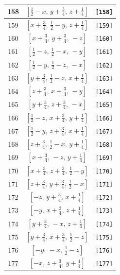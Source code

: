 \documentclass[fleqn,8pt]{jsarticle}
\begin{document}
\begin{longtable}{ccc}
158 & $\left[ \frac{1}{2} - x,\, y + \frac{3}{4},\, z + \frac{1}{4} \right]$ & {\tt [158]} \\ \hline
159 & $\left[ x + \frac{3}{4},\, \frac{1}{2} - y,\, z + \frac{1}{4} \right]$ & {\tt [159]} \\ \hline
160 & $\left[ x + \frac{3}{4},\, y + \frac{3}{4},\, - z \right]$ & {\tt [160]} \\ \hline
161 & $\left[ \frac{1}{2} - z,\, \frac{1}{2} - x,\, - y \right]$ & {\tt [161]} \\ \hline
162 & $\left[ \frac{1}{2} - y,\, \frac{1}{2} - z,\, - x \right]$ & {\tt [162]} \\ \hline
163 & $\left[ y + \frac{3}{4},\, \frac{1}{2} - z,\, x + \frac{1}{4} \right]$ & {\tt [163]} \\ \hline
164 & $\left[ z + \frac{3}{4},\, x + \frac{3}{4},\, - y \right]$ & {\tt [164]} \\ \hline
165 & $\left[ y + \frac{3}{4},\, z + \frac{3}{4},\, - x \right]$ & {\tt [165]} \\ \hline
166 & $\left[ \frac{1}{2} - z,\, x + \frac{3}{4},\, y + \frac{1}{4} \right]$ & {\tt [166]} \\ \hline
167 & $\left[ \frac{1}{2} - y,\, z + \frac{3}{4},\, x + \frac{1}{4} \right]$ & {\tt [167]} \\ \hline
168 & $\left[ z + \frac{3}{4},\, \frac{1}{2} - x,\, y + \frac{1}{4} \right]$ & {\tt [168]} \\ \hline
169 & $\left[ x + \frac{3}{4},\, - z,\, y + \frac{1}{4} \right]$ & {\tt [169]} \\ \hline
170 & $\left[ x + \frac{3}{4},\, z + \frac{3}{4},\, \frac{1}{2} - y \right]$ & {\tt [170]} \\ \hline
171 & $\left[ z + \frac{3}{4},\, y + \frac{3}{4},\, \frac{1}{2} - x \right]$ & {\tt [171]} \\ \hline
172 & $\left[ - z,\, y + \frac{3}{4},\, x + \frac{1}{4} \right]$ & {\tt [172]} \\ \hline
173 & $\left[ - y,\, x + \frac{3}{4},\, z + \frac{1}{4} \right]$ & {\tt [173]} \\ \hline
174 & $\left[ y + \frac{3}{4},\, - x,\, z + \frac{1}{4} \right]$ & {\tt [174]} \\ \hline
175 & $\left[ y + \frac{3}{4},\, x + \frac{3}{4},\, \frac{1}{2} - z \right]$ & {\tt [175]} \\ \hline
176 & $\left[ - y,\, - x,\, \frac{1}{2} - z \right]$ & {\tt [176]} \\ \hline
177 & $\left[ - x,\, z + \frac{3}{4},\, y + \frac{1}{4} \right]$ & {\tt [177]} \\ \hline

\end{longtable}
\end{document}
